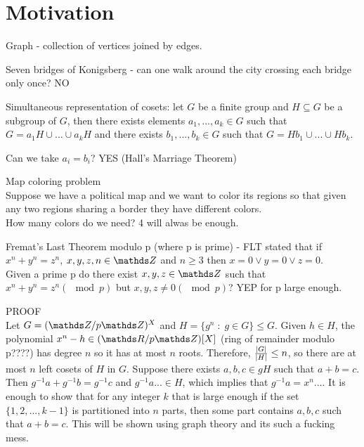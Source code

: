\section{Motivation}

\begin{multicols*}{2}
   
    {\color{def}Graph} - collection of vertices joined by edges.
    \medskip

    {\color{acc}Seven bridges of Konigsberg} - can one walk around the city crossing each bridge only once? NO


    {\color{def}Simultaneous representation of cosets}: let $G$ be a finite group and $H\subseteq G$ be a subgroup of $G$, then there exists elements $a_1, ..., a_k\in G$ such that $G=a_1H\cup ...\cup a_kH$ and there exists $b_1, ..., b_k\in G$ such that $G=Hb_1\cup...\cup Hb_k$.\smallskip

    Can we take $a_i=b_i$? YES (Hall's Marriage Theorem)
    \bigskip

    {\color{def}Map coloring problem}\\
    Suppose we have a political map and we want to color its regions so that given any two regions sharing a border they have different colors.\\
    How many colors do we need? 4 will alwas be enough.
    \bigskip

    Fremat's Last Theorem modulo p (where p is prime) - FLT stated that if $x^n+y^n=z^n$, $x,y,z,n\in\Z$ and $n\geq 3$ then $x=0\lor y=0\lor z=0$.\\
    Given a prime p do there exist $x,y,z\in\Z$ such that $x^n+y^n=z^n(\mod p)$ but $x,y,z\neq 0 (\mod p)$? YEP for p large enough.
    \medskip

    PROOF\\
    Let $G=(\Z/p\Z)^X$ and $H=\{g^n\;:\;g\in G\}\leq G$. Given $h\in H$, the polynomial $x^n-h\in (\R/p\Z)[X]$ ({\color{cyan}ring of remainder modulo p????}) has degree $n$ so it has at most $n$ roots. Therefore, ${|G|\over |H|}\leq n$, so there are at most $n$ left cosets of $H$ in $G$. Suppose there exists $a,b,c\in gH$ such that $a+b=c$. Then $g^{-1}a+g^{-1}b=g^{-1}c$ and $g^{-1}a...\in H$, which implies that $g^{-1}a=x^n...$. It is enough to show that for any integer $k$ that is large enough if the set $\{1, 2, ..., k-1\}$ is partitioned into $n$ parts, then some part contains $a,b,c$ such that $a+b=c$. This will be shown using graph theory and its such a fucking mess.

\end{multicols*}









